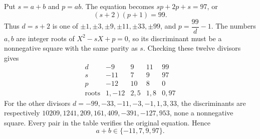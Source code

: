 Put $s=a+b$ and $p=ab$. The equation becomes $sp+2p+s=97$, or
\[
(s+2)(p+1)=99.
\]
Thus $d=s+2$ is one of $\pm1,\pm3,\pm9,\pm11,\pm33,\pm99$, and $p=\dfrac{99}{d}-1$. The numbers $a,b$ are integer roots of $X^2-sX+p=0$, so its discriminant must be a nonnegative square with the same parity as $s$. Checking these twelve divisors gives
\[
\begin{array}{c|rrrr}
d&-9&9&11&99\\ \hline
s&-11&7&9&97\\
p&-12&10&8&0\\
\text{roots}&1,-12&2,5&1,8&0,97
\end{array}
\]
For the other divisors $d=-99,-33,-11,-3,-1,1,3,33$, the discriminants are respectively $10209,1241,209,161,409,-391,-127,953$, none a nonnegative square. Every pair in the table verifies the original equation. Hence
\[
\boxed{a+b\in\{-11,7,9,97\}}.
\]
